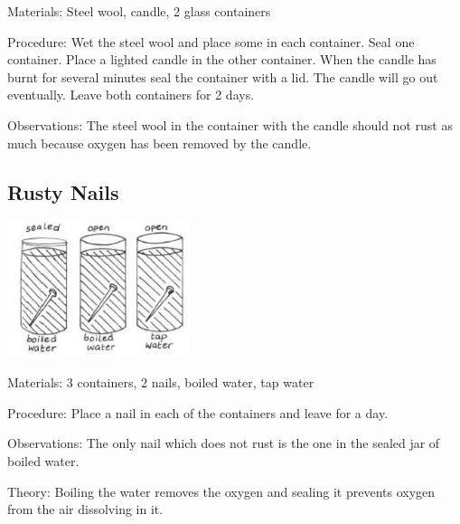 \begin{multicols}{2}
\begin{description*}
\item[Materials:]{Steel wool, candle, 2 glass containers}
\item[Procedure:]{Wet the steel wool and place some in each container. Seal one
container. Place a lighted candle in the other container. When the
candle has burnt for several minutes seal the container with a lid. The
candle will go out eventually. Leave both containers for 2 days. }
\item[Observations:]{The
steel wool in the container with the candle should not rust as much
because oxygen has been removed by the candle.}
\end{description*}

\subsection{Rusty Nails}

\begin{center}
\includegraphics[width=0.4\textwidth]{./img/vso/rusty-nails.jpg}
\end{center}

\begin{description*}
\item[Materials:]{3 containers, 2 nails, boiled water, tap water}
\item[Procedure:]{Place a nail in each of the
containers and leave for a day.}
\item[Observations:]{The only nail which does not rust
is the one in the sealed jar of
boiled water.}
\item[Theory:]{Boiling the water
removes the oxygen and sealing it
prevents oxygen from the air
dissolving in it.}
\end{description*}


\end{multicols}
